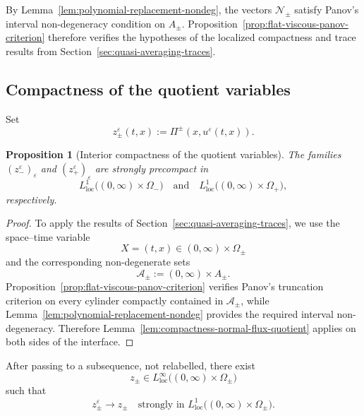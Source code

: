 \documentclass[11pt]{amsart}
\numberwithin{equation}{section}
\theoremstyle{plain}
\newtheorem{proposition}[theorem]{Proposition}
\theoremstyle{definition}
\theoremstyle{remark}
\begin{document}
By Lemma~\ref{lem:polynomial-replacement-nondeg}, the vectors
\(\mathcal N_\pm\) satisfy Panov's interval non-degeneracy condition on
\(A_\pm\). Proposition~\ref{prop:flat-viscous-panov-criterion} therefore
verifies the hypotheses of the localized compactness and trace results from
Section~\ref{sec:quasi-averaging-traces}.

\subsection{Compactness of the quotient variables}
\label{subsec:flat-quotient-compactness}

Set
\begin{equation}
\label{eq:flat-projecteds}
    z_\pm^\varepsilon(t,x)
    :=
    \Pi^\pm(x,u^\varepsilon(t,x)).
\end{equation}

\begin{proposition}[Interior compactness of the quotient variables]
\label{prop:flat-interior-quotient-compactness}
The families \((z_-^\varepsilon)_\varepsilon\) and
\((z_+^\varepsilon)_\varepsilon\) are strongly precompact in
\[
    L^1_{\mathrm{loc}}
    \bigl((0,\infty)\times\Omega_-\bigr)
    \quad\text{and}\quad
    L^1_{\mathrm{loc}}
    \bigl((0,\infty)\times\Omega_+\bigr),
\]
respectively.
\end{proposition}

\begin{proof}
To apply the results of Section~\ref{sec:quasi-averaging-traces}, we use the
space--time variable
\[
    X=(t,x)\in(0,\infty)\times\Omega_\pm
\]
and the corresponding non-degenerate sets
\[
    \mathcal A_\pm
    :=
    (0,\infty)\times A_\pm.
\]
Proposition~\ref{prop:flat-viscous-panov-criterion} verifies Panov's
truncation criterion on every cylinder compactly contained in
\(\mathcal A_\pm\), while
Lemma~\ref{lem:polynomial-replacement-nondeg} provides the required interval
non-degeneracy. Therefore
Lemma~\ref{lem:compactness-normal-flux-quotient} applies on both sides of the
interface. \end{proof}

After passing to a subsequence, not relabelled, there exist
\[
    z_\pm\in
    L^\infty_{\mathrm{loc}}
    \bigl((0,\infty)\times\Omega_\pm\bigr)
\]
such that
\begin{equation}
\label{eq:flat-projecteds-limit}
    z_\pm^\varepsilon
    \longrightarrow z_\pm
    \quad\text{strongly in }
    L^1_{\mathrm{loc}}
    \bigl((0,\infty)\times\Omega_\pm\bigr).
\end{equation}
\end{document}
